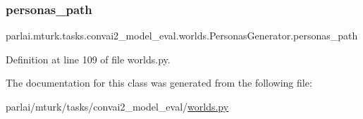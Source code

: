 \subsubsection{\texorpdfstring{personas\+\_\+path}{personas\_path}}
{\footnotesize\ttfamily parlai.\+mturk.\+tasks.\+convai2\+\_\+model\+\_\+eval.\+worlds.\+Personas\+Generator.\+personas\+\_\+path}



Definition at line 109 of file worlds.\+py.



The documentation for this class was generated from the following file\+:\begin{DoxyCompactItemize}
\item 
parlai/mturk/tasks/convai2\+\_\+model\+\_\+eval/\hyperlink{parlai_2mturk_2tasks_2convai2__model__eval_2worlds_8py}{worlds.\+py}\end{DoxyCompactItemize}
